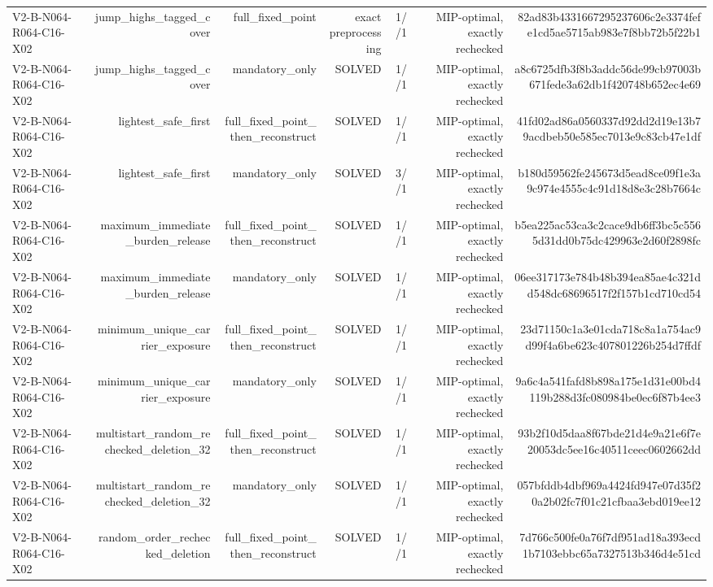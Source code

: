 {\begin{longtable}{lrrrrrr}
V2-B-N064-R064-C16-X02 & jump\_highs\_tagged\_cover & full\_fixed\_point & exact preprocessing & 1//1 & MIP-optimal, exactly rechecked & 82ad83b4331667295237606c2e3374fefe1cd5ae5715ab983e7f8bb72b5f22b1 \\
V2-B-N064-R064-C16-X02 & jump\_highs\_tagged\_cover & mandatory\_only & SOLVED & 1//1 & MIP-optimal, exactly rechecked & a8c6725dfb3f8b3addc56de99cb97003b671fede3a62db1f420748b652ec4e69 \\
V2-B-N064-R064-C16-X02 & lightest\_safe\_first & full\_fixed\_point\_then\_reconstruct & SOLVED & 1//1 & MIP-optimal, exactly rechecked & 41fd02ad86a0560337d92dd2d19e13b79acdbeb50e585ec7013e9c83cb47e1df \\
V2-B-N064-R064-C16-X02 & lightest\_safe\_first & mandatory\_only & SOLVED & 3//1 & MIP-optimal, exactly rechecked & b180d59562fe245673d5ead8ce09f1e3a9c974e4555c4c91d18d8e3c28b7664c \\
V2-B-N064-R064-C16-X02 & maximum\_immediate\_burden\_release & full\_fixed\_point\_then\_reconstruct & SOLVED & 1//1 & MIP-optimal, exactly rechecked & b5ea225ac53ca3c2cace9db6ff3bc5c5565d31dd0b75dc429963e2d60f2898fc \\
V2-B-N064-R064-C16-X02 & maximum\_immediate\_burden\_release & mandatory\_only & SOLVED & 1//1 & MIP-optimal, exactly rechecked & 06ee317173e784b48b394ea85ae4c321dd548dc68696517f2f157b1cd710cd54 \\
V2-B-N064-R064-C16-X02 & minimum\_unique\_carrier\_exposure & full\_fixed\_point\_then\_reconstruct & SOLVED & 1//1 & MIP-optimal, exactly rechecked & 23d71150c1a3e01cda718c8a1a754ac9d99f4a6be623c407801226b254d7ffdf \\
V2-B-N064-R064-C16-X02 & minimum\_unique\_carrier\_exposure & mandatory\_only & SOLVED & 1//1 & MIP-optimal, exactly rechecked & 9a6c4a541fafd8b898a175e1d31e00bd4119b288d3fc080984be0ec6f87b4ee3 \\
V2-B-N064-R064-C16-X02 & multistart\_random\_rechecked\_deletion\_32 & full\_fixed\_point\_then\_reconstruct & SOLVED & 1//1 & MIP-optimal, exactly rechecked & 93b2f10d5daa8f67bde21d4e9a21e6f7e20053dc5ee16c40511ceec0602662dd \\
V2-B-N064-R064-C16-X02 & multistart\_random\_rechecked\_deletion\_32 & mandatory\_only & SOLVED & 1//1 & MIP-optimal, exactly rechecked & 057bfddb4dbf969a4424fd947e07d35f20a2b02fc7f01c21cfbaa3ebd019ee12 \\
V2-B-N064-R064-C16-X02 & random\_order\_rechecked\_deletion & full\_fixed\_point\_then\_reconstruct & SOLVED & 1//1 & MIP-optimal, exactly rechecked & 7d766c500fe0a76f7df951ad18a393ecd1b7103ebbc65a7327513b346d4e51cd \\

\end{longtable}}
